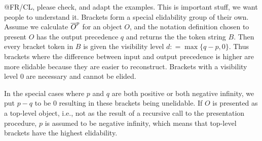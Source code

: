 \begin{newpart}{@FR/CL, please check, and adapt the examples. This is important stuff, we
    want people to understand it.}
  Brackets form a special elidability group of their own. Assume we calculate $\overline{O}^{p}$
  for an {\openmath} object $O$, and the notation definition chosen to present $O$ has the
  output precedence $q$ and returns the the token string $B$. Then every bracket token in
  $B$ is given the visibility level $d\colon=\max\{q-p,0\}$. Thus brackets where the
  difference between input and output precedence is higher are more elidable because they
  are easier to reconstruct. Brackets with a visibility level 0 are necessary and cannot
  be elided.

  In the special cases where $p$ and $q$ are both positive or both negative infinity, we
  put $p-q$ to be $0$ resulting in these brackets being unelidable. If $O$ is presented as
  a top-level object, i.e., not as the result of a recursive call to the presentation
  procedure, $p$ is assumed to be negative infinity, which means that top-level brackets
  have the highest elidability.
\end{newpart}

